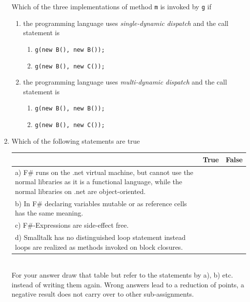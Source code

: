 \documentclass{article}
\begin{document}
\begin{enumerate}
Which of the three implementations of method \lstinline!m! is invoked by
\lstinline!g! if
\begin{enumerate}
\item the programming language uses \emph{single-dynamic dispatch} and
  the call statement is
 \begin{enumerate}
    \item \lstinline!g(new B(), new B());!
    \item \lstinline!g(new B(), new C());!
  \end{enumerate}
  \item the programming language uses \emph{multi-dynamic dispatch}
    and the call statement is
 \begin{enumerate}
    \item \lstinline!g(new B(), new B());!
    \item \lstinline!g(new B(), new C());!
    \end{enumerate}
\end{enumerate}
\item Which of the following statements are true\\
    \begin{tabular}{|p{6cm}|c|c|}\hline
      & True & False \\ \hline
      a) F\# runs on the \textsf{.net} virtual machine, but cannot use the
      normal libraries as it is a functional language, while the normal
      libraries on \textsf{.net} are object-oriented. & & \\\hline
      b) In F\# declaring variables mutable or as reference cells has
      the same meaning. & & \\\hline
      c) F\#-Expressions are side-effect free. & & \\\hline
      d) Smalltalk has no distinguished loop statement instead loops
      are realized as methods invoked on block closures.  & & \\\hline
   \end{tabular}\\
   For your answer draw that table but refer to the statements by a),
   b) etc. instead of writing them again. Wrong answers lead to a
   reduction of points, a negative result does not carry over to other
   sub-assignments. 
\end{enumerate}
\end{document}
